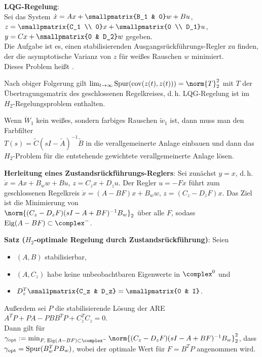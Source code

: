 \textbf{LQG-Regelung}:\\
Sei das System $\dot{x} = Ax + \smallpmatrix{B_1 & 0} w + Bu$,
$z = \smallpmatrix{C_1 \\ 0} x + \smallpmatrix{0 \\ D_1} u$,
$y = Cx + \smallpmatrix{0 & D_2} w$ gegeben.\\
Die Aufgabe ist es, einen stabilisierenden Ausgangsrückführungs-Regler zu finden, der die
asymptotische Varianz von $z$ für weißes Rauschen $w$ minimiert.\\
Dieses Problem heißt .

Nach obiger Folgerung gilt
$\lim_{t \to \infty} \Spur(\cov(z(t), z(t))) = \norm{T}_2^2$ mit $T$ der Übertragungsmatrix des
geschlossenen Regelkreises,
d.\,h. LQG-Regelung ist im $H_2$-Regelungsproblem enthalten.

Wenn $\dot{W}_1$ kein weißes, sondern farbiges Rauschen $\widetilde{w}_1$ ist, dann muss man den
Farbfilter\\
$T(s) = \widetilde{C} (sI - \widetilde{A})^{-1} \widetilde{B}$ in die verallgemeinerte
Anlage einbauen und dann das $H_2$-Problem für die entstehende gewichtete verallgemeinerte Anlage
lösen.

\linie

\textbf{Herleitung eines Zustandsrückführungs-Reglers}:
Sei zunächst $y = x$, d.\,h.\\
$\dot{x} = Ax + B_w w + Bu$, $z = C_z x + D_z u$.
Der Regler $u = -Fx$ führt zum geschlossenen Regelkreis
$\dot{x} = (A - BF)x + B_w w$, $z = (C_z - D_z F)x$.
Das Ziel ist die Minimierung von\\
$\norm{(C_z - D_z F)(sI - A + BF)^{-1} B_w}_2$
über alle $F$, sodass $\Eig(A - BF) \subset \complex^-$.

\textbf{Satz ($H_2$-optimale Regelung durch Zustandsrückführung)}:
Seien
\begin{itemize}
    \item
    $(A, B)$ stabilisierbar,

    \item
    $(A, C_z)$ habe keine unbeobachtbaren Eigenwerte in $\complex^0$ und

    \item
    $D_z^T \smallpmatrix{C_z & D_z} = \smallpmatrix{0 & I}$.
\end{itemize}
Außerdem sei $P$ die stabilisierende Lösung der ARE $A^T P + PA - PBB^T P + C_z^T C_z = 0$.\\
Dann gilt für
$\gamma_\opt := \min_{F,\;\Eig(A-BF)\subset\complex^-}
\norm{(C_z - D_z F)(sI - A + BF)^{-1} B_w}_2^2$, dass\\
$\gamma_{\text{opt}} = \operatorname{Spur}(B_w^T P B_w)$, wobei der optimale Wert für $F = B^T P$ angenommen wird.

